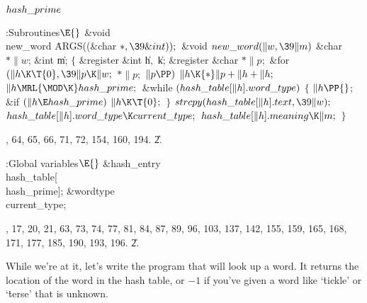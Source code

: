 \Y\B\4\D$\\{hash\_prime}$ \5
\par
\Y\B\4:Subroutines\X${}\E{}$\6
\&{void} \\{new\_word}\,\,\.{ARGS}((\&{char} ${}{*},\39\&{int}));{}$\7
\&{void} ${}\\{new\_word}(\|w,\39\|m){}$\1\1\6
\&{char} ${}{*}\|w{}$;\6
\&{int} \|m;\2\2\6
${}\{{}$\1\6
\&{register} \&{int} \|h${},{}$ \|k;\6
\&{register} \&{char} ${}{*}\|p;{}$\7
\&{for} ${}(\|h\K\T{0},\39\|p\K\|w;{}$ ${}{*}\|p;{}$ ${}\|p\PP){}$\1\5
${}\|h\K{*}\|p+\|h+\|h;{}$\2\6
${}\|h\MRL{{\MOD}{\K}}\\{hash\_prime};{}$\6
\&{while} ${}(\\{hash\_table}[\|h].\\{word\_type}){}$\5
${}\{{}$\1\6
${}\|h\PP{}$;\5
\&{if} ${}(\|h\E\\{hash\_prime}){}$\1\5
${}\|h\K\T{0};{}$\2\6
\4${}\}{}$\2\6
${}\\{strcpy}(\\{hash\_table}[\|h].\\{text},\39\|w);{}$\6
${}\\{hash\_table}[\|h].\\{word\_type}\K\\{current\_type};{}$\6
${}\\{hash\_table}[\|h].\\{meaning}\K\|m;{}$\6
\4${}\}{}$\2\par
{}, 64, 65, 66, 71, 72, 154, 160, 194.
\U2.\fi

\B{}:Global variables\X${}\E{}$\6
\&{hash\_entry} \\{hash\_table}[\\{hash\_prime}];\6
\&{wordtype} \\{current\_type};\par
{}, 17, 20, 21, 63, 73, 74, 77, 81, 84, 87, 89, 96, 103, 137, 142, 155, 159,
165, 168, 171, 177, 185, 190, 193, 196.
\U2.\fi

While we're at it, let's write the program that will look up
a word.
It returns the location of the word in the hash table, or $-1$ if
you've given a word like `\.{tickle}' or `\.{terse}' that is unknown.

